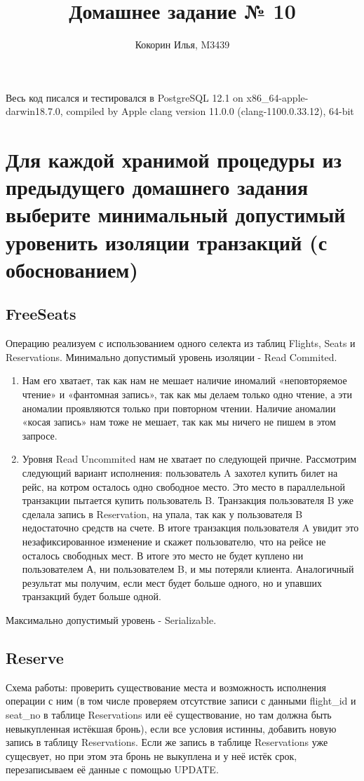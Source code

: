 \documentclass{article}
\title{Домашнее задание № 10}
\author{Кокорин Илья, M3439}
\begin{document}
	\maketitle
	
Весь код писался и тестировался в PostgreSQL 12.1 on x86\_64-apple-darwin18.7.0, compiled by Apple clang version 11.0.0 (clang-1100.0.33.12), 64-bit

\section{Для каждой хранимой процедуры из предыдущего домашнего задания выберите минимальный допустимый уровенить изоляции транзакций (с обоснованием)}

\subsection{FreeSeats}
Операцию реализуем с использованием одного селекта из таблиц Flights, Seats и Reservations.
Минимально допустимый уровень изоляции - Read Commited.
\begin{enumerate}
\item Нам его хватает, так как нам не мешает наличие иномалий «неповторяемое чтение» и «фантомная запись», так как мы делаем только одно чтение, а эти аномалии проявляются только при повторном чтении. Наличие аномалии «косая запись» нам тоже не мешает, так как мы ничего не пишем в этом запросе.

\item Уровня Read Uncommited нам не хватает по следующей причне. Рассмотрим следующий вариант исполнения: пользователь A захотел купить билет на рейс, на котром осталось одно свободное место. Это место в параллельной транзакции пытается купить пользователь B. Транзакция пользователя B уже сделала запись в Reservation, на упала, так как у пользователя B недостаточно средств на счете. В итоге транзакция пользователя A увидит это незафиксированное изменение и скажет пользователю, что на рейсе не осталось свободных мест. В итоге это место не будет куплено ни пользователем А, ни пользователем B, и мы потеряли клиента. Аналогичный результат мы получим, если мест будет больше одного, но и упавших транзакций будет больше одной.
\end{enumerate}

Максимально допустимый уровень - Serializable.

\subsection{Reserve}
Схема работы: проверить существование места и возможность исполнения операции с ним (в том числе проверяем отсутствие записи с данными flight\_id и seat\_no в таблице Reservations или её существование, но там должна быть невыкупленная истёкшая бронь), если все условия истинны, добавить новую запись в таблицу Reservations. Если же запись в таблице Reservations уже сущесвует, но при этом эта бронь не выкуплена и у неё истёк срок, перезаписываем её данные с помощью UPDATE.
\end{document}
